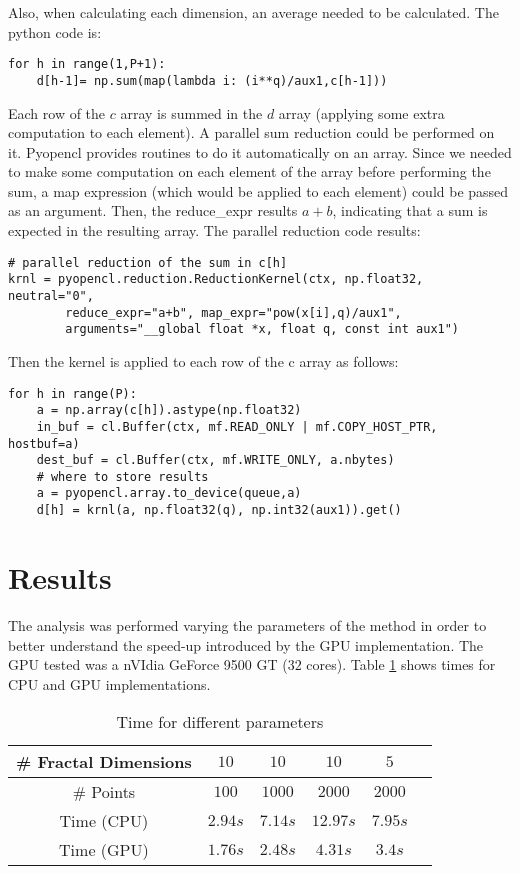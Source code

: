 \documentclass[oneside,a4paper,english,links]{article}
\begin{document}
Also, when calculating each dimension, an average needed to be calculated. The python code is:

\begin{verbatim}
for h in range(1,P+1):        
    d[h-1]= np.sum(map(lambda i: (i**q)/aux1,c[h-1]))
\end{verbatim}

Each row of the $c$ array is summed in the $d$ array (applying some extra computation to each element). A parallel sum reduction could be performed on it. Pyopencl provides routines to do it automatically on an array. Since we needed to make some computation on each element of the array before performing the sum, a map expression (which would be applied to each element) could be passed as an argument. Then, the reduce\_expr results $a+b$, indicating that a sum is expected in the resulting array. The parallel reduction code results:


\begin{verbatim}
# parallel reduction of the sum in c[h]
krnl = pyopencl.reduction.ReductionKernel(ctx, np.float32, neutral="0",
        reduce_expr="a+b", map_expr="pow(x[i],q)/aux1",
        arguments="__global float *x, float q, const int aux1")
\end{verbatim}

Then the kernel is applied to each row of the c array as follows:

\begin{verbatim}
for h in range(P):        
    a = np.array(c[h]).astype(np.float32)
    in_buf = cl.Buffer(ctx, mf.READ_ONLY | mf.COPY_HOST_PTR, hostbuf=a)
    dest_buf = cl.Buffer(ctx, mf.WRITE_ONLY, a.nbytes)
    # where to store results      
    a = pyopencl.array.to_device(queue,a)
    d[h] = krnl(a, np.float32(q), np.int32(aux1)).get()  
\end{verbatim}
\section{Results}
The analysis was performed varying the parameters of the method in order to better understand the speed-up introduced by the GPU implementation. The GPU tested was a nVIdia GeForce 9500 GT ($32$ cores). Table \ref{table:tableFirstTest} shows times for CPU and GPU implementations.

\begin{table}[htb]
\centering
\begin{tabular}{|c|c|c|c|c|c|}
    \hline
    \# Fractal Dimensions & $10$ & $10$ & $10$ & $5$ \\
    \hline
    \# Points & $100$ & $1000$ & $2000$ & $2000$ \\
    \hline
    Time (CPU)  & $2.94s$ & $7.14s$ & $12.97s$ & $7.95s$\\
    \hline
    Time (GPU) & $1.76s$ & $2.48s$ & $4.31s$ & $3.4s$ \\
    \hline
\end{tabular}
\caption{Time for different parameters}
\label{table:tableFirstTest}
\end{table}
\end{document}
